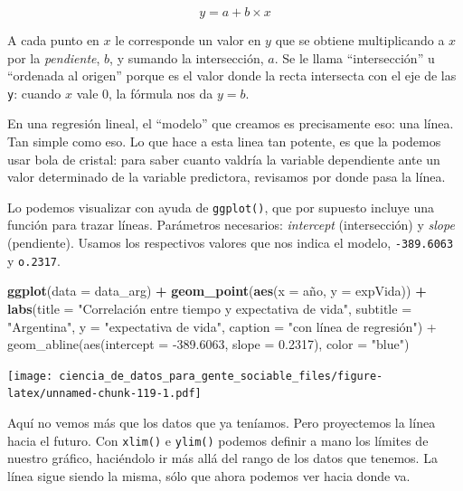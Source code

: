\documentclass[spanish,]{book}
\newenvironment{Shaded}{\begin{snugshade}}{\end{snugshade}}
\newcommand{\DataTypeTok}[1]{\textcolor[rgb]{0.13,0.29,0.53}{#1}}
\newcommand{\KeywordTok}[1]{\textcolor[rgb]{0.13,0.29,0.53}{\textbf{#1}}}
\newcommand{\NormalTok}[1]{#1}
\newcommand{\OperatorTok}[1]{\textcolor[rgb]{0.81,0.36,0.00}{\textbf{#1}}}
\newcommand{\StringTok}[1]{\textcolor[rgb]{0.31,0.60,0.02}{#1}}
\begin{document}
\[ y = a + b \times x \]

A cada punto en \(x\) le corresponde un valor en \(y\) que se obtiene multiplicando a \(x\) por la \emph{pendiente}, \(b\), y sumando la intersección, \(a\). Se le llama ``intersección'' u ``ordenada al origen'' porque es el valor donde la recta intersecta con el eje de las \texttt{y}: cuando \(x\) vale \(0\), la fórmula nos da \(y = b\).

En una regresión lineal, el ``modelo'' que creamos es precisamente eso: una línea. Tan simple como eso. Lo que hace a esta linea tan potente, es que la podemos usar bola de cristal: para saber cuanto valdría la variable dependiente ante un valor determinado de la variable predictora, revisamos por donde pasa la línea.

Lo podemos visualizar con ayuda de \texttt{ggplot()}, que por supuesto incluye una función para trazar líneas. Parámetros necesarios: \emph{intercept} (intersección) y \emph{slope} (pendiente). Usamos los respectivos valores que nos indica el modelo, \texttt{-389.6063} y \texttt{o.2317}.

\begin{Shaded}
\begin{Highlighting}[]
\KeywordTok{ggplot}\NormalTok{(}\DataTypeTok{data =}\NormalTok{ data_arg) }\OperatorTok{+}\StringTok{ }
\StringTok{    }\KeywordTok{geom_point}\NormalTok{(}\KeywordTok{aes}\NormalTok{(}\DataTypeTok{x =}\NormalTok{ año, }\DataTypeTok{y =}\NormalTok{ expVida)) }\OperatorTok{+}
\StringTok{    }\KeywordTok{labs}\NormalTok{(}\DataTypeTok{title =} \StringTok{"Correlación entre tiempo y expectativa de vida"}\NormalTok{,}
         \DataTypeTok{subtitle =} \StringTok{"Argentina"}\NormalTok{,}
         \DataTypeTok{y =} \StringTok{"expectativa de vida"}\NormalTok{,}
         \DataTypeTok{caption =} \StringTok{"con línea de regresión") +}
\StringTok{    geom_abline(aes(intercept = -389.6063, slope = 0.2317), color = "}\NormalTok{blue}\StringTok{")}
\end{Highlighting}
\end{Shaded}

\texttt{[image: ciencia\_de\_datos\_para\_gente\_sociable\_files/figure-latex/unnamed-chunk-119-1.pdf]}

Aquí no vemos más que los datos que ya teníamos. Pero proyectemos la línea hacia el futuro. Con \texttt{xlim()} e \texttt{ylim()} podemos definir a mano los límites de nuestro gráfico, haciéndolo ir más allá del rango de los datos que tenemos. La línea sigue siendo la misma, sólo que ahora podemos ver hacia donde va.
\end{document}
